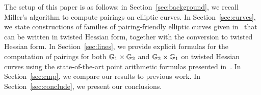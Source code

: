 \ifpublic
The setup of this paper is as follows:
in Section~\ref{sec:background}, we recall Miller's algorithm to compute pairings on elliptic curves.
In Section~\ref{sec:curves}, we state constructions of families of pairing-friendly elliptic curves given in~\cite{2010/freeman}
that can be written in twisted Hessian form, together with the conversion
to twisted Hessian form.
In Section~\ref{sec:lines}, we provide explicit formulas for the computation of 
pairings for both $\mathbb{G}_{1} \times \mathbb{G}_{2}$ and $\mathbb{G}_{2} \times \mathbb{G}_{1}$ 
on twisted Hessian curves
using the state-of-the-art point arithmetic formulas presented in~\cite{2015/hessian}.
In Section~\ref{sec:cmp}, we compare our results to previous work.
In Section~\ref{sec:conclude}, we present our conclusions.
\fi



